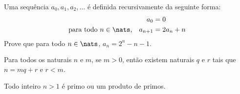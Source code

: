 \begin{exercise}
%
%
%
    Uma sequência $a_0, a_1, a_2, \ldots$ é definida recursivamente da seguinte forma:
    \begin{align*}
        a_0 &= 0 \\
        \text{para todo $n\in\nats$,}\quad
        a_{n+1} &= 2a_n + n
    \end{align*}
    Prove que para todo $n\in\nats$, $a_n = 2^n - n - 1$.
\end{exercise}

\begin{exercise}
    Para todos os naturais $n$ e $m$, se $m > 0$, então existem naturais $q$ e $r$ tais que $n = mq + r$ e $r < m$.
\end{exercise}

\begin{exercise}
    Todo inteiro $n > 1$ é primo ou um produto de primos.
\end{exercise}
